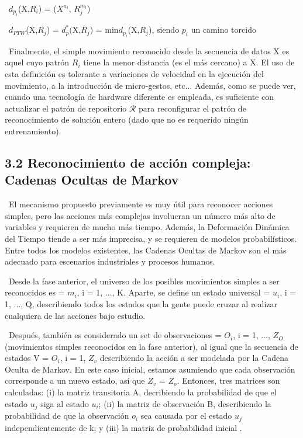 \documentclass{paper}
\begin{document}
\ $d_{p_i}$(X,$R_i$) = \sum($X^{n_l}$, $R_j^{m_l}$)

\ $d_{PTW}$(X,$R_j$) = $d_p^*($X,$R_j$) = min{$d_{p_i}$(X,$R_j$), siendo $p_i$ un camino torcido}

\ Finalmente, el simple movimiento reconocido desde la secuencia de datos X es aquel cuyo patrón $R_i$ tiene la menor distancia (es el más cercano) a X. El uso de esta definición es tolerante a variaciones de velocidad en la ejecución del movimiento, a la introducción de micro-gestos, etc... Además, como se puede ver, cuando una tecnología de hardware diferente es empleada, es suficiente con actualizar el patrón de repositorio $\mathcal{R}$ para reconfigurar el patrón de reconocimiento de solución entero (dado que no es requerido ningún entrenamiento).


\subsection*{3.2 Reconocimiento de acción compleja: Cadenas Ocultas de Markov}

\ El mecanismo propuesto previamente es muy útil para reconocer acciones simples, pero las acciones más complejas involucran un número más alto de variables y requieren de mucho más tiempo. Además, la Deformación Dinámica del Tiempo tiende a ser más imprecisa, y se requieren de modelos probabilísticos. Entre todos los modelos existentes, las Cadenas Ocultas de Markov son el más adecuado para escenarios industriales y procesos humanos.

\ Desde la fase anterior, el universo de los posibles movimientos simples a ser reconocidos es  = {$m_i$, i = 1, ..., K}. Aparte, se define un estado universal  = {$u_i$, i = 1, ..., Q}, describiendo todos los estados que la gente puede cruzar al realizar cualquiera de las acciones bajo estudio.

\ Después, también es considerado un set de observaciones  = {$O_i$, i = 1, ..., $Z_O$} (movimientos simples reconocidos en la fase anterior), al igual que la secuencia de estados V = {$O_i$, i = 1, $Z_v$} describiendo la acción a ser modelada por la Cadena Oculta de Markov. En este caso inicial, estamos asumiendo que cada observación corresponde a un nuevo estado, así que $Z_v$ = $Z_o$. Entonces, tres matrices son calculadas: (i) la matriz transitoria A, decribiendo la probabilidad de que el estado $u_j$ siga al estado $u_i$; (ii) la matriz de observación B, describiendo la probabilidad de que la observación $o_i$ sea causada por el estado $u_j$ independientemente de k; y (iii) la matriz de probabilidad inicial \prod.
\end{document}
